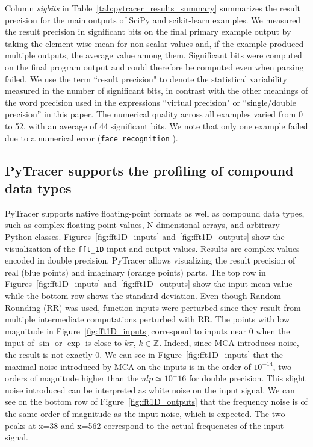 \documentclass[10pt,journal,compsoc]{IEEEtran}
\newcommand{\pytracer}[0]{PyTracer\xspace}
\DeclareRobustCommand{\add}[1]{\textcolor{ao(english)}{#1}}%
\DeclareRobustCommand{\remove}[1]{}
\DeclareRobustCommand{\add}[1]{#1}
\DeclareRobustCommand{\remove}[1]{}
\begin{document}
Column \textit{sigbits} in Table~\ref{tab:pytracer_results_summary} summarizes
the \add{result} precision for the main outputs of SciPy and scikit-learn examples. We
measured the \add{result} precision in significant bits on the final primary example output
by taking the element-wise mean for non-scalar values and, if the example
produce\add{d multiple} outputs, the average value among them. \add{Significant bits were computed on the final program output
    and could therefore be computed even when parsing failed.} \add{We use the term ``result precision"
    to denote the statistical variability measured in the number of significant bits, in 
    contrast with the other meanings of the word precision used in the expressions
    ``virtual precision" or ``single/double precision'' in this paper.} The numerical
quality across all examples varied from 0 to 52, with an average of 44
significant bits. We note that only one example failed due to a
numerical error (\texttt{face\_recognition}
\remove{for RR and \texttt{Bayesian Ridge Regression} for full MCA}).


\subsection{\pytracer supports the profiling of compound data types}

\add{PyTracer supports native floating-point formats as well as compound
    data types, such as complex floating-point values, N-dimensional arrays,
    and arbitrary Python classes.} Figures~\ref{fig:fft1D_inputs}
and~\ref{fig:fft1D_outputs} \add{show the visualization of the
    \texttt{fft\_1D} input and output values. Results are complex values
    encoded in double precision. PyTracer allows visualizing the
    \add{result} precision of real (blue points) and imaginary (orange
    points) parts.} \add{The} top row in Figures~\ref{fig:fft1D_inputs}
and~\ref{fig:fft1D_outputs} show the input mean value while the bottom
row shows the standard deviation. \add{Even though Random Rounding
    (RR) was used, function inputs were perturbed since they result from
    multiple intermediate computations perturbed with RR.} The points with
low magnitude in Figure~\ref{fig:fft1D_inputs} correspond to inputs
near 0 when the input of $\sin$ or $\exp$ is close to $k\pi$, $k \in
    \mathbb{Z}$. Indeed, since MCA introduces noise, the result is not
exactly 0. We can see in Figure~\ref{fig:fft1D_inputs} that the maximal
noise introduced by MCA on the inputs is in the order of $10^{-14}$,
two orders of magnitude higher than the $ulp \simeq 10^-16$ for double precision. This slight
noise introduced can be interpreted as white noise on the input signal. We can
see on the bottom row of Figure~\ref{fig:fft1D_outputs} that the frequency noise
is of the same order of magnitude as the input noise, which is expected. The
two peaks at x=38 and x=562 correspond to the actual frequencies of the input
signal.
\end{document}
